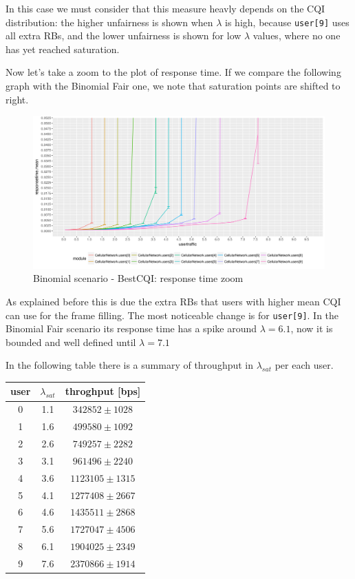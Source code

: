 In this case we must consider that this measure heavly depends on the CQI distribution: the higher unfairness is shown when \(\lambda\) is high, because \texttt{user[9]} uses all extra RBs, and the lower unfairness is shown for low \(\lambda\) values, where no one has yet reached saturation.

Now let's take a zoom to the plot of response time. If we compare the following graph with the Binomial Fair one, we note that saturation points are shifted to right. 
\begin{figure}[H]
  \includegraphics[width=1\textwidth]{images/allrt-binombest.png}
  \caption{Binomial scenario - BestCQI: response time zoom}
  \label{fig:allrt-binombest}
\end{figure}
As explained before this is due the extra RBs that users with higher mean CQI can use for the frame filling. The most noticeable change is for \texttt{user[9]}. In the Binomial Fair scenario its response time has a spike around \(\lambda = 6.1\), now it is bounded and well defined until \(\lambda = 7.1\)

In the following table there is a summary of throughput in \(\lambda_{sat}\) per each user.
\begin{center}
	\begin{tabular}{|c | c | c|}
	\hline
	 \textbf{user}  & \textbf{\(\lambda_{sat}\)}  & \textbf{throghput [bps]} \\ \hline
	 0 & 1.1 & $342852 \pm 1028$ \\ \hline
	 1 & 1.6 & $499580 \pm 1092$\\ \hline
	 2 & 2.6 & $749257 \pm 2282$\\ \hline
	 3 & 3.1 & $961496 \pm 2240$\\ \hline
	 4 & 3.6 & $1123105 \pm 1315$\\ \hline
	 5 & 4.1 & $1277408 \pm 2667$ \\ \hline
	 6 & 4.6 & $1435511 \pm 2868$\\ \hline
	 7 & 5.6 & $1727047 \pm 4506$ \\ \hline
	 8 & 6.1 & $1904025 \pm 2349$ \\ \hline
	 9 & 7.6 & $2370866 \pm 1914$ \\ \hline
	\end{tabular}
\end{center}


